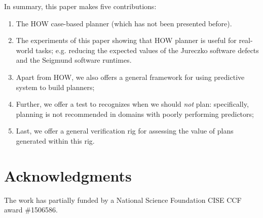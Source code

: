 \documentclass[conference]{IEEEtran}
\newcommand{\be}{\begin{enumerate}}
\newcommand{\ee}{\end{enumerate}}
\begin{document}
In summary, this paper makes five contributions:
\be
\item The HOW  case-based planner (which has not been presented before).
\item The experiments of this paper showing that HOW planner is useful for real-world tasks;
e.g. reducing the
expected values of the Jureczko software defects and the Seigmund software runtimes.
\item Apart from HOW, we  also offers a general framework for using  predictive system to build planners;
\item Further, we offer a  test to recognizes  when we should {\em not}  plan: specifically,
planning is
not recommended in domains with  poorly performing predictors;
\item Last, we  offer a general verification rig for assessing the value of plans generated within this rig.
\ee 

\section*{Acknowledgments}

The work has partially funded by a National Science Foundation CISE CCF award \#1506586.
 
 
{}

\end{document}
